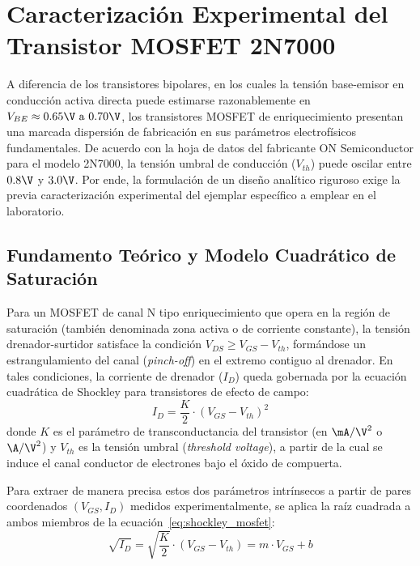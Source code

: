 \chapter{Caracterización Experimental del Transistor MOSFET 2N7000}
\label{chap:caracterizacion_mosfet}

A diferencia de los transistores bipolares, en los cuales la tensión base-emisor en conducción activa directa puede
estimarse razonablemente en $V_{BE} \approx 0.65\V \text{ a } 0.70\V$, los transistores MOSFET de enriquecimiento
presentan una marcada dispersión de fabricación en sus parámetros electrofísicos fundamentales. De acuerdo con la
hoja de datos del fabricante ON Semiconductor para el modelo 2N7000, la tensión umbral de conducción ($V_{th}$) puede
oscilar entre $0.8\V$ y $3.0\V$. Por ende, la formulación de un diseño analítico riguroso exige la previa caracterización
experimental del ejemplar específico a emplear en el laboratorio.

\section{Fundamento Teórico y Modelo Cuadrático de Saturación}

Para un MOSFET de canal N tipo enriquecimiento que opera en la región de saturación (también denominada zona activa o de
corriente constante), la tensión drenador-surtidor satisface la condición $V_{DS} \ge V_{GS} - V_{th}$, formándose un
estrangulamiento del canal (\textit{pinch-off}) en el extremo contiguo al drenador. En tales condiciones, la corriente de
drenador ($I_D$) queda gobernada por la ecuación cuadrática de Shockley para transistores de efecto de campo:
\begin{equation}
  I_D = \frac{K}{2} \cdot (V_{GS} - V_{th})^2
  \label{eq:shockley_mosfet}
\end{equation}
donde $K$ es el parámetro de transconductancia del transistor (en $\mA/\V^2$ o $\A/\V^2$) y $V_{th}$ es la tensión
umbral (\textit{threshold voltage}), a partir de la cual se induce el canal conductor de electrones bajo el óxido de compuerta.

Para extraer de manera precisa estos dos parámetros intrínsecos a partir de pares coordenados $(V_{GS}, I_D)$ medidos
experimentalmente, se aplica la raíz cuadrada a ambos miembros de la ecuación~\eqref{eq:shockley_mosfet}:
\begin{equation}
  \sqrt{I_D} = \sqrt{\frac{K}{2}} \cdot (V_{GS} - V_{th}) = m \cdot V_{GS} + b
  \label{eq:recta_raiz_id}
\end{equation}

